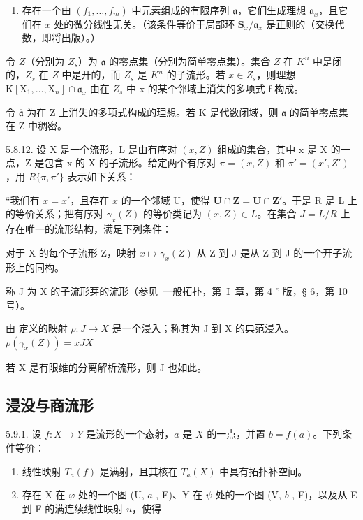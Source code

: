 \begin{enumerate}
\def\labelenumi{(\Alph{enumi})}
\setcounter{enumi}{18}
\tightlist
\item
  存在一个由 \((f_1, \ldots, f_m)\) 中元素组成的有限序列 \(\mathfrak{a}\)，它们生成理想 \(\mathfrak{a}_x\)，且它们在 \(x\) 处的微分线性无关。（该条件等价于局部环 \(\mathbf{S}_x / \mathfrak{a}_x\) 是正则的（交换代数，即将出版）。）
\end{enumerate}

令 \(Z\)（分别为 \(Z_s\)）为 \(\mathfrak{a}\) 的零点集（分别为简单零点集）。集合 \(Z\) 在 \(K^n\) 中是闭的，\(Z_s\) 在 \(Z\) 中是开的，而 \(Z_s\) 是 \(K^{n}\) 的子流形。若 \(x \in Z_{s}\)，则理想 \(\mathrm{K}[\mathrm{X}_{1}, \ldots, \mathrm{X}_{n}] \cap \mathfrak{a}_{x}\) 由在 \(Z_{s}\) 中 x 的某个邻域上消失的多项式 f 构成。

令 \(\overline{\mathfrak{a}}\) 为在 Z 上消失的多项式构成的理想。若 K 是代数闭域，则 \(\mathfrak{a}\) 的简单零点集在 Z 中稠密。

5.8.12. 设 X 是一个流形，L 是由有序对 \((x, Z)\) 组成的集合，其中 x 是 X 的一点，Z 是包含 x 的 X 的子流形。给定两个有序对 \(\pi = (x, Z)\) 和 \(\pi' = (x', Z')\)，用 \(R\{\pi, \pi'\}\) 表示如下关系：

“我们有 \(x = x'\)，且存在 \(x\) 的一个邻域 U，使得 \(\mathbf{U} \cap \mathbf{Z} = \mathbf{U} \cap \mathbf{Z'}\)。于是 R 是 L 上的等价关系；把有序对 \(\gamma_x(Z)\) 的等价类记为 \((x, Z) \in L\)。在集合 \(J = L/R\) 上存在唯一的流形结构，满足下列条件：

对于 X 的每个子流形 Z，映射 \(x \mapsto \gamma_{x}(Z)\) 从 Z 到 J 是从 Z 到 J 的一个开子流形上的同构。

称 J 为 X 的子流形芽的流形（参见~一般拓扑，第~I~章，第 4 \(^{e}\) 版，§ 6，第 10 号）。

由  定义的映射 \(\rho: J \to X\) 是一个浸入；称其为 J 到 X 的典范浸入。\(\rho(\gamma_x(Z)) = x\)\(J\)\(X\)

若 X 是有限维的分离解析流形，则 J 也如此。

\subsection{浸没与商流形}

5.9.1. 设 \(f: X \to Y\) 是流形的一个态射，\(a\) 是 \(X\) 的一点，并置 \(b = f(a)\)。下列条件等价：

\begin{enumerate}
\def\labelenumi{(\roman{enumi})}
\item
  线性映射 \(T_{a}(f)\) 是满射，且其核在 \(T_{a}(X)\) 中具有拓扑补空间。
\item
  存在 X 在 \(\varphi\) 处的一个图 (U, \(a\) , E)、Y 在 \(\psi\) 处的一个图 (V, \(b\) , F)，以及从 E 到 F 的满连续线性映射 \(u\)，使得
\end{enumerate}

